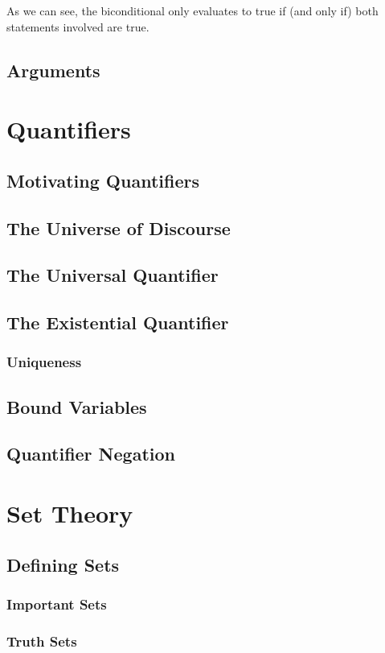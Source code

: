 \documentclass{article}
\begin{document}
As we can see, the biconditional only evaluates to true if (and only if) both statements
involved are true.

\subsection{Arguments}

\section{Quantifiers}
\subsection{Motivating Quantifiers}
\subsection{The Universe of Discourse}
\subsection{The Universal Quantifier}
\subsection{The Existential Quantifier}
\subsubsection{Uniqueness}
\subsection{Bound Variables}
\subsection{Quantifier Negation}

\section{Set Theory}
\subsection{Defining Sets}
\subsubsection{Important Sets}
\subsubsection{Truth Sets}
\end{document}
